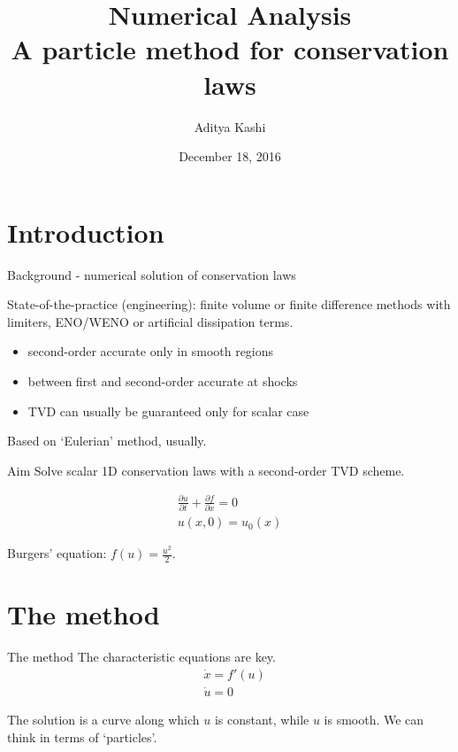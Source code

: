 \documentclass{beamer}
\author{Aditya Kashi}
\institute{McGill University}
\date{December 18, 2016}
\title{Numerical Analysis \\ A particle method for conservation laws}
\begin{document}
	
\begin{frame}
	\titlepage
\end{frame}

\section{Introduction}
\begin{frame}{Background - numerical solution of conservation laws}

State-of-the-practice (engineering): finite volume or finite difference methods with limiters, ENO/WENO or artificial dissipation terms.
\begin{itemize}
	\item second-order accurate only in smooth regions
	\item between first and second-order accurate at shocks
	\item TVD can usually be guaranteed only for scalar case
\end{itemize}
Based on `Eulerian' method, usually.
\end{frame}

\begin{frame}{Aim}
Solve scalar 1D conservation laws with a second-order TVD scheme.

\begin{align}
\frac{\partial u}{\partial t} + \frac{\partial f}{\partial x} = 0 \\
u(x,0) = u_0(x)
\label{eq:problem}
\end{align}

Burgers' equation: $f(u) = \frac{u^2}{2}$.
\end{frame}

\section{The method}

\begin{frame}{The method}
The characteristic equations are key. \cite{particle}
\begin{align}
&\dot{x} = f'(u) \\
&\dot{u} = 0
\end{align}

The solution is a curve along which $u$ is constant, while $u$ is smooth. We can think in terms of `particles'.
\end{frame}
\end{document}
